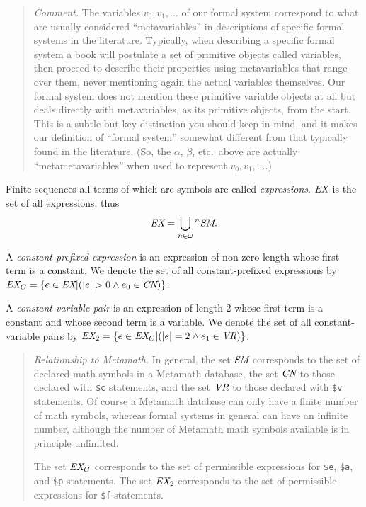 {\footnotesize\begin{quotation}
{\em Comment.} The variables $v_0, v_1, \ldots$ of our formal system
correspond to what are usually considered ``metavariables'' in
descriptions of specific formal systems in the literature.  Typically,
when describing a specific formal system a book will postulate a set of
primitive objects called variables, then proceed to describe their
properties using metavariables that range over them, never mentioning
again the actual variables themselves.  Our formal system does not
mention these primitive variable objects at all but deals directly with
metavariables, as its primitive objects, from the start.  This is a
subtle but key distinction you should keep in mind, and it makes our
definition of ``formal system'' somewhat different from that typically
found in the literature.  (So, the $\alpha$, $\beta$, etc.\ above are
actually ``metametavariables'' when used to represent $v_0, v_1,
\ldots$.)
\end{quotation}}

Finite sequences all terms of which are symbols are called {\em
expressions}.  $\mbox{\em EX}$ is
the set of all expressions; thus
\begin{displaymath}
\mbox{\em EX} = \bigcup _{n \in \omega} {}^n \mbox{\em SM}.
\end{displaymath}

A {\em constant-prefixed expression}
is an expression of non-zero length
whose first term is a constant.  We denote the set of all constant-prefixed
expressions by $\mbox{\em EX}_C = \{ e \in \mbox{\em EX} | ( |e| > 0 \wedge
e_0 \in \mbox{\em CN} ) \}$.

A {\em constant-variable pair}
is an expression of length 2 whose first term
is a constant and whose second term is a variable.  We denote the set of all
constant-variable pairs by $\mbox{\em EX}_2 = \{ e \in \mbox{\em EX}_C | ( |e|
= 2 \wedge e_1 \in \mbox{\em VR} ) \}$.


{\footnotesize\begin{quotation}
{\em Relationship to Metamath.} In general, the set $\mbox{\em SM}$
corresponds to the set of declared math symbols in a Metamath database, the
set $\mbox{\em CN}$ to those declared with \texttt{\$c} statements, and the set
$\mbox{\em VR}$ to those declared with \texttt{\$v} statements.  Of course a
Metamath database can only have a finite number of math symbols, whereas
formal systems in general can have an infinite number, although the number of
Metamath math symbols available is in principle unlimited.

The set $\mbox{\em EX}_C$ corresponds to the set of permissible expressions
for \texttt{\$e}, \texttt{\$a}, and \texttt{\$p} statements.  The set $\mbox{\em EX}_2$
corresponds to the set of permissible expressions for \texttt{\$f} statements.
\end{quotation}}

